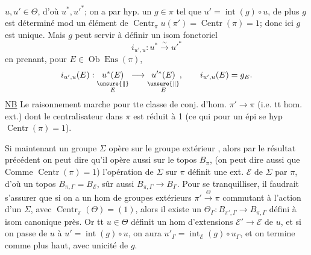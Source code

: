  \(u,u'\in\Theta\), d'où \(u^*,u'^*\); on a par hyp.
 un \(g\in\pi\) tel que \(u'=\operatorname{int}(g)\circ u\),
de plus \(g\) est déterminé mod un
élément de \(\operatorname{Centr}_\pi u(\pi')=\operatorname{Centr}(\pi)=1\);
donc ici \(g\) est unique. Mais \(g\)
peut servir à définir un isom
fonctoriel 
\[
i_{u',u}:u^*\xrightarrow{\sim}u'^*
\]
en prenant, pour \(E\in\operatorname{Ob}\operatorname{Ens}(\pi)\),
\[
i_{u',u}(E):
\underset{\substack{\unsure{\Vert}\\E}}{u^*(E)}
\longrightarrow
\underset{\substack{\unsure{\Vert}\\E}}{u'^*(E)},
\qquad i_{u',u}(E)=g_E.
\]
\uline{NB} Le raisonnement marche pour tte classe
de conj. d'hom.  \(\pi'\longrightarrow\pi\) (i.e. tt hom.
ext.) dont le centralisateur dans \(\pi\) est
réduit à 1 (ce qui pour un épi se
hyp \(\operatorname{Centr}(\pi)=1\)).

Si maintenant un groupe \(\Sigma\) opère
sur le groupe extérieur \inserted{\(\pi\)}, alors par le
résultat précédent on peut dire qu'il
opère aussi sur le topos \(B_\pi\),  (on peut
dire aussi que  Comme
\(\operatorname{Centr}(\pi)=1\)) l'opération de \deleted{\(\unsure{\pi}\)}\(\Sigma\) sur \(\pi\)
définit une ext. \(\mathcal E\) de \(\Sigma\) par \(\pi\),
d'où un topos \(B_{\pi,\Gamma}=B_{\mathcal E}\),   
sûr aussi \(B_{\pi,\Gamma}\longrightarrow B_{\Gamma}\). Pour se
tranquilliser, il faudrait s'assurer que
si on a un hom de groupes extérieurs
\(\pi'\xrightarrow{\Theta}\pi\) commutant à l'action d'un
\(\Sigma\), avec \(\operatorname{Centr}_\pi(\Theta)=(1)\), alors il existe
un \(\Theta_{\Gamma}:B_{\pi',\Gamma}\longrightarrow B_{\pi,\Gamma}\) défini à isom
canonique près. Or tt \(u\in\Theta\) définit un
hom d'extensions 
\(\mathcal E'\longrightarrow\mathcal E\)  de
\(u\), et si on passe de \(u\) à \(u'=\operatorname{int}(g)\circ u\), on aura
\(u'_{\Gamma}=\operatorname{int}_{\mathcal E}(g)\circ u_{\Gamma}\), et on termine comme
plus haut, avec unicité de \(g\).

